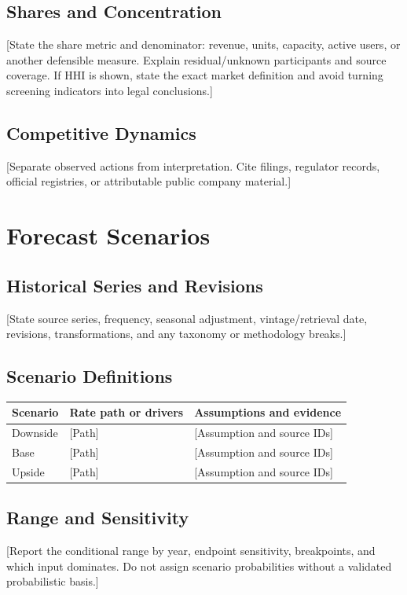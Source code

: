 \documentclass[11pt,letterpaper]{report}
\begin{document}
\section{Shares and Concentration}
[State the share metric and denominator: revenue, units, capacity, active
users, or another defensible measure. Explain residual/unknown participants and
source coverage. If HHI is shown, state the exact market definition and avoid
turning screening indicators into legal conclusions.]

\section{Competitive Dynamics}
[Separate observed actions from interpretation. Cite filings, regulator
records, official registries, or attributable public company material.]

\chapter{Forecast Scenarios}

\section{Historical Series and Revisions}
[State source series, frequency, seasonal adjustment, vintage/retrieval date,
revisions, transformations, and any taxonomy or methodology breaks.]

\section{Scenario Definitions}
\begin{longtable}{@{}p{}p{}p{}@{}}
\toprule
Scenario & Rate path or drivers & Assumptions and evidence \\
\midrule
\endhead
Downside & [Path] & [Assumption and source IDs] \\
Base & [Path] & [Assumption and source IDs] \\
Upside & [Path] & [Assumption and source IDs] \\
\bottomrule
\end{longtable}

\section{Range and Sensitivity}
[Report the conditional range by year, endpoint sensitivity, breakpoints, and
which input dominates. Do not assign scenario probabilities without a
validated probabilistic basis.]
\end{document}
